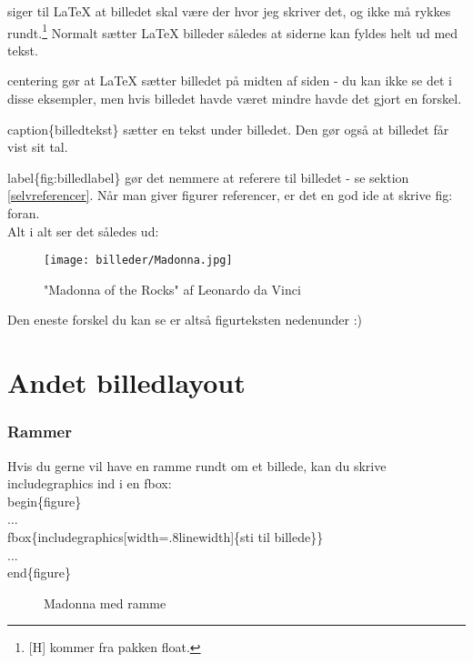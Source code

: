 \noindent
[H] siger til LaTeX at billedet skal være der hvor jeg skriver det, og ikke må rykkes rundt.\footnote{[H] kommer fra pakken float.} Normalt sætter LaTeX billeder således at siderne kan fyldes helt ud med tekst.

\noindent
\bs centering gør at LaTeX sætter billedet på midten af siden - du kan ikke se det i disse eksempler, men hvis billedet havde været mindre havde det gjort en forskel.

\noindent
\bs caption\{billedtekst\} sætter en tekst under billedet. Den gør også at billedet får vist sit tal.

\noindent
\bs label\{fig:billedlabel\} gør det nemmere at referere til billedet - se sektion  \ref{selvreferencer}. Når man giver figurer referencer, er det en god ide at skrive fig: foran.\\

\noindent
Alt i alt ser det således ud:

\begin{figure}[H]
\centering
\texttt{[image: billeder/Madonna.jpg]}
\caption{"Madonna of the Rocks" af Leonardo da Vinci}
\label{fig:madonna_standard}
\end{figure}

Den eneste forskel du kan se er altså figurteksten nedenunder :)

\section{Andet billedlayout}
\subsubsection{Rammer}
Hvis du gerne vil have en ramme rundt om et billede, kan du skrive \bs includegraphics ind i en \bs fbox:\\

\indent \bs begin\{figure\}\\
\indent ... \\
\indent \bs fbox\{\bs includegraphics[width=.8\bs linewidth]\{sti til billede\}\}\\
\indent ... \\
\indent \bs end\{figure\}\\

\begin{figure}[H]
\centering
{}
\caption{Madonna med ramme}
\label{fig:madonna_ramme}
\end{figure}

